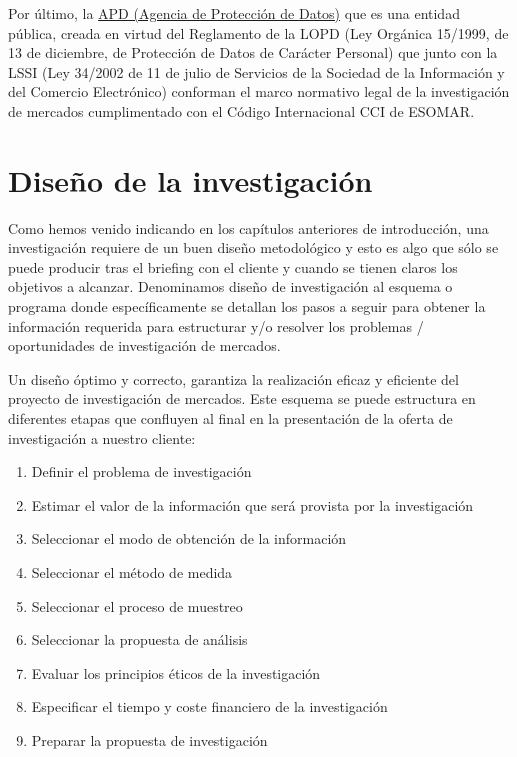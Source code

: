 \documentclass[
]{book}
\providecommand{\tightlist}{%
  \setlength{\itemsep}{0pt}\setlength{\parskip}{0pt}}
\begin{document}
Por último, la \href{https://www.aepd.es/es}{APD (Agencia de Protección de Datos)} que es una entidad pública, creada en virtud del Reglamento de la LOPD (Ley Orgánica 15/1999, de 13 de diciembre, de Protección de Datos de Carácter Personal) que junto con la LSSI (Ley 34/2002 de 11 de julio de Servicios de la Sociedad de la Información y del Comercio Electrónico) conforman el marco normativo legal de la investigación de mercados cumplimentado con el Código Internacional CCI de ESOMAR.

\hypertarget{tema02}{%
\chapter{Diseño de la investigación}\label{tema02}}

Como hemos venido indicando en los capítulos anteriores de introducción, una investigación requiere de un buen diseño metodológico y esto es algo que sólo se puede producir tras el briefing con el cliente y cuando se tienen claros los objetivos a alcanzar. Denominamos diseño de investigación al esquema o programa donde específicamente se detallan los pasos a seguir para obtener la información requerida para estructurar y/o resolver los problemas / oportunidades de investigación de mercados.

Un diseño óptimo y correcto, garantiza la realización eficaz y eficiente del proyecto de investigación de mercados. Este esquema se puede estructura en diferentes etapas que confluyen al final en la presentación de la oferta de investigación a nuestro cliente:

\begin{enumerate}
\def\labelenumi{\arabic{enumi}.}
\tightlist
\item
  Definir el problema de investigación
\item
  Estimar el valor de la información que será provista por la investigación
\item
  Seleccionar el modo de obtención de la información
\item
  Seleccionar el método de medida
\item
  Seleccionar el proceso de muestreo
\item
  Seleccionar la propuesta de análisis
\item
  Evaluar los principios éticos de la investigación
\item
  Especificar el tiempo y coste financiero de la investigación
\item
  Preparar la propuesta de investigación
\end{enumerate}
\end{document}
